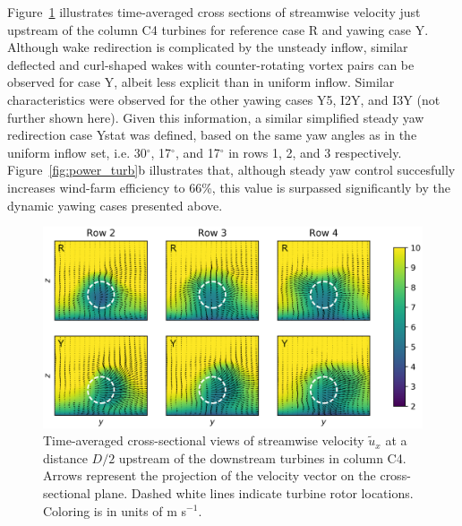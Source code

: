 	Figure~\ref{fig:cross_section_turb} illustrates time-averaged cross sections of streamwise velocity just upstream of the column C4 turbines for reference case R and yawing case Y. Although wake redirection is complicated by the unsteady inflow, similar deflected and curl-shaped wakes with counter-rotating vortex pairs can be observed for case Y, albeit less explicit than in uniform inflow. Similar characteristics were observed for the other yawing cases Y5, I2Y, and I3Y (not further shown here). Given this information, a similar simplified steady yaw redirection case Ystat was defined, based on the same yaw angles as in the uniform inflow set, i.e. 30$^\circ$, 17$^\circ$, and 17$^\circ$ in rows 1, 2, and 3 respectively. Figure~\ref{fig:power_turb}b illustrates that, although steady yaw control succesfully increases wind-farm efficiency to 66\%, this value is surpassed significantly by the dynamic yawing cases presented above.
	\begin{figure}
		\includegraphics[width=\textwidth]{chapters/optimal_yaw_control/frontview_yaw_turb.eps}
		\caption[Time-averaged cross-sectional views of streamwise velocity $\widetilde{u}_x$ at a distance $D/2$ upstream of the downstream turbines in column C4.]{Time-averaged cross-sectional views of streamwise velocity $\widetilde{u}_x$ at a distance $D/2$ upstream of the downstream turbines in column C4. Arrows represent the projection of the velocity vector on the cross-sectional plane. Dashed white lines indicate turbine rotor locations. Coloring is in units of m s$^{-1}$. \label{fig:cross_section_turb}}
	\end{figure}

